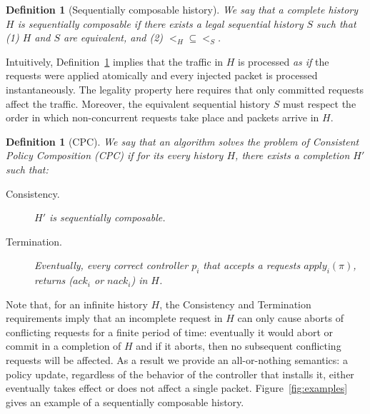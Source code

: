 \documentclass[11pt,pdftex,letter]{article}
\newcommand{\dom}{\textit{dom}}
\newcommand{\ie}{{\it i.e.}}
\newcommand{\ssnote}[1]{\textcolor{heraldBlue}{\small \bf [SS: #1]}}
\newcommand{\ssnote}[1]{}
\newcommand{\ack}{\textit{ack}}
\newcommand{\nack}{\textit{nack}}
\newtheorem{definition}[theorem]{Definition}
\begin{document}


\begin{definition}[Sequentially composable history]\label{def:history}
We say that a complete history $H$ is \emph{sequentially composable}
if there exists a legal sequential history $S$ such that (1) $H$ and
$S$ are equivalent, and (2)  $<_H\subseteq <_S$.
\end{definition}
%
Intuitively, Definition~\ref{def:history} implies that the traffic in
$H$ is processed \emph{as if} the requests were applied atomically and
every injected packet is processed instantaneously.
The legality property here requires that only committed requests affect the traffic.
Moreover, the equivalent sequential history $S$ must respect the
order in which non-concurrent requests take place and packets arrive in $H$.

\begin{definition}[CPC]\label{def:CPC}
We say that an algorithm solves the problem of Consistent Policy
Composition (CPC) if for its every history $H$, there exists a
completion $H'$ such that:
\begin{description}

\item[Consistency.] $H'$ is sequentially composable.


\item[Termination.] Eventually, every correct controller $p_i$
  that accepts a requests $\textit{apply}_i(\pi)$, returns ($\ack_i$ or
  $\nack_i$) in $H$.
\end{description}
\end{definition}
%
%
%
Note that, for an infinite history $H$, the Consistency and Termination
requirements imply that an incomplete request in $H$ can only cause
aborts of conflicting requests for a finite period of time: eventually it
would abort or commit in a completion of $H$ and if it aborts, then no
subsequent conflicting requests will be affected.
As a result we provide an all-or-nothing semantics:
a policy update, regardless of the behavior of the controller that
installs it,  either eventually takes effect or does not affect a single packet.
Figure~\ref{fig:examples} gives an example of a sequentially
composable history.
\end{document}
